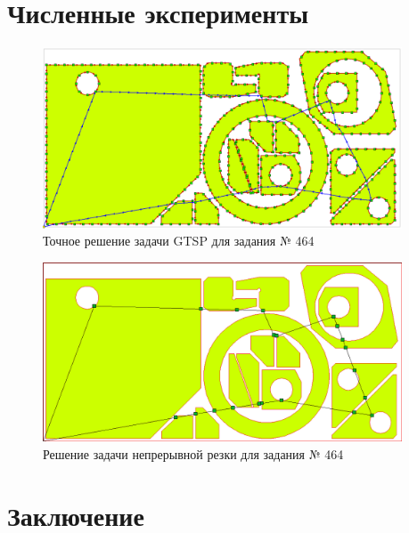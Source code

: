 \documentclass[14pt]{extarticle}
\theoremstyle{plain}%
\theoremstyle{definition}
\theoremstyle{remark}
\begin{document}
\section{Численные эксперименты}

\begin{figure}
  \begin{center}
    \includegraphics[width=0.95\textwidth]{464-gtsp.png}
  \end{center}
  \caption{Точное решение задачи GTSP для задания № 464}
  \label{gtsp-path}
\end{figure}

\begin{figure}
  \begin{center}
    \includegraphics[width=0.95\textwidth]{464-ccp.png}
  \end{center}
  \caption{Решение задачи непрерывной резки для задания № 464}
  \label{ccp-path}
\end{figure}

\section{Заключение}

\printbibliography[heading=bibintoc]
\nocite{*}
\end{document}
